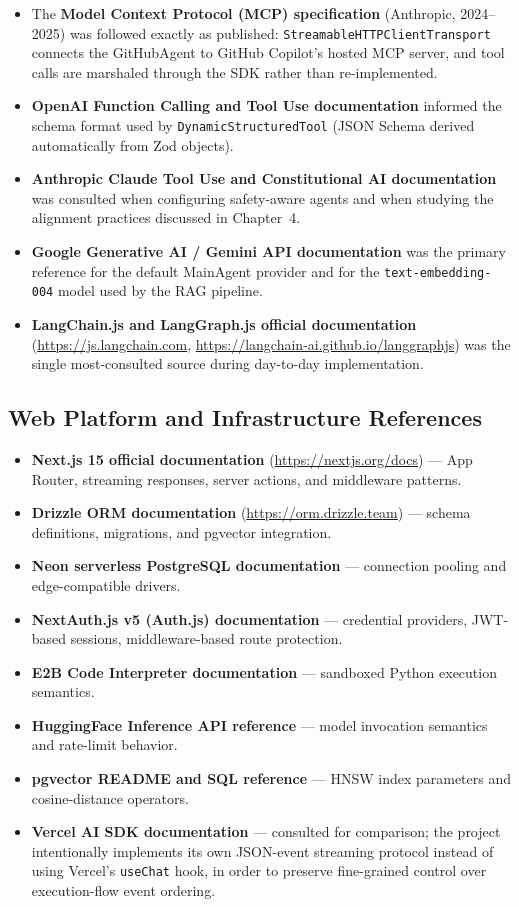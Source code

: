 \documentclass[11pt,a4paper]{report}
\newcommand{\code}[1]{\texttt{\small #1}}
\begin{document}
\begin{itemize}
  \item The \textbf{Model Context Protocol (MCP) specification} (Anthropic, 2024--2025) was followed exactly as published: \code{StreamableHTTPClientTransport} connects the GitHubAgent to GitHub Copilot's hosted MCP server, and tool calls are marshaled through the SDK rather than re-implemented.
  \item \textbf{OpenAI Function Calling and Tool Use documentation} informed the schema format used by \code{DynamicStructuredTool} (JSON Schema derived automatically from Zod objects).
  \item \textbf{Anthropic Claude Tool Use and Constitutional AI documentation} was consulted when configuring safety-aware agents and when studying the alignment practices discussed in Chapter~4.
  \item \textbf{Google Generative AI / Gemini API documentation} was the primary reference for the default MainAgent provider and for the \code{text-embedding-004} model used by the RAG pipeline.
  \item \textbf{LangChain.js and LangGraph.js official documentation} (\url{https://js.langchain.com}, \url{https://langchain-ai.github.io/langgraphjs}) was the single most-consulted source during day-to-day implementation.
\end{itemize}

\subsection{Web Platform and Infrastructure References}

\begin{itemize}
  \item \textbf{Next.js 15 official documentation} (\url{https://nextjs.org/docs}) --- App Router, streaming responses, server actions, and middleware patterns.
  \item \textbf{Drizzle ORM documentation} (\url{https://orm.drizzle.team}) --- schema definitions, migrations, and pgvector integration.
  \item \textbf{Neon serverless PostgreSQL documentation} --- connection pooling and edge-compatible drivers.
  \item \textbf{NextAuth.js v5 (Auth.js) documentation} --- credential providers, JWT-based sessions, middleware-based route protection.
  \item \textbf{E2B Code Interpreter documentation} --- sandboxed Python execution semantics.
  \item \textbf{HuggingFace Inference API reference} --- model invocation semantics and rate-limit behavior.
  \item \textbf{pgvector README and SQL reference} --- HNSW index parameters and cosine-distance operators.
  \item \textbf{Vercel AI SDK documentation} --- consulted for comparison; the project intentionally implements its own JSON-event streaming protocol instead of using Vercel's \code{useChat} hook, in order to preserve fine-grained control over execution-flow event ordering.
\end{itemize}
\end{document}
